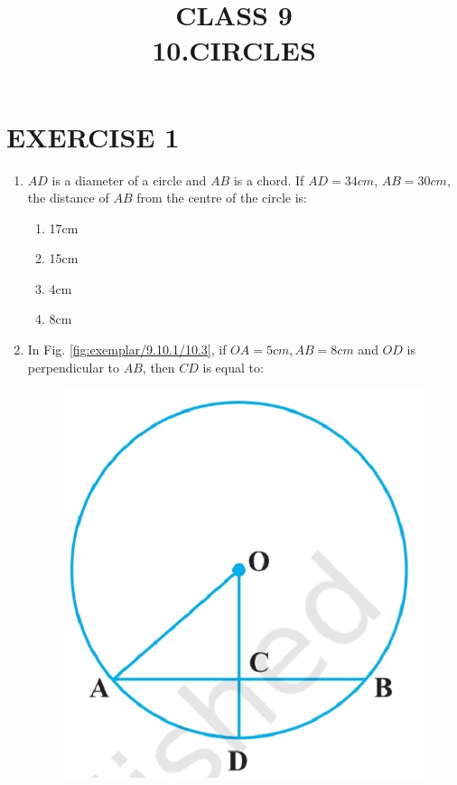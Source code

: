 \documentclass{article}
\begin{document}
 
\title{CLASS 9\\10.CIRCLES}
\date{}
\maketitle
\section{EXERCISE 1}
\fi
\begin{enumerate}
\item $AD$ is a diameter of a circle and $AB$ is a chord. If $AD = 34 cm$, $AB = 30 cm$, the distance of $AB$ from the centre of the circle is:
\begin{enumerate}
\item 17cm
\item 15cm
\item 4cm
\item 8cm
\end{enumerate}
\item In Fig. \ref{fig:exemplar/9.10.1/10.3}, if $OA = 5cm, AB = 8cm$ and $OD$ is perpendicular to $AB$, then $CD$ is equal to:
\begin{figure}[H]
\centering
\includegraphics[width=\columnwidth]{exemplar/9.10.1/figs/10.3.jpg}
\caption{}

\end{figure}
\end{enumerate}
\end{document}

